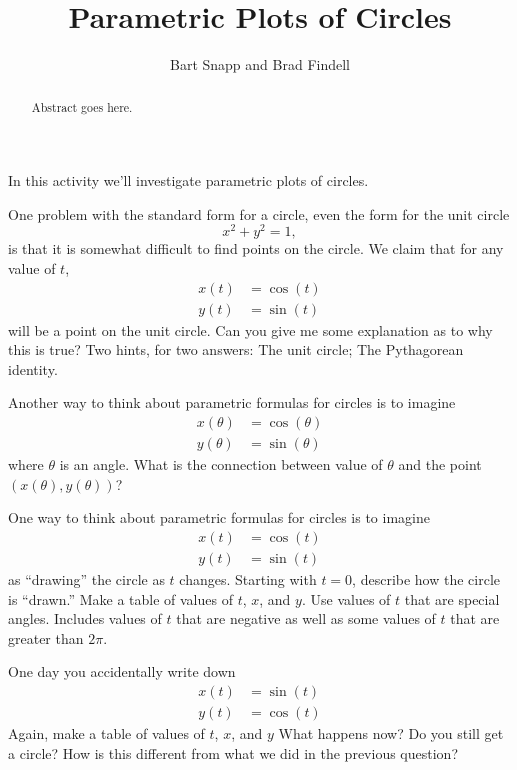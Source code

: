 \documentclass{ximera}
\title{Parametric Plots of Circles}
\author{Bart Snapp and Brad Findell}
\begin{document}
\begin{abstract}
Abstract goes here.  
\end{abstract}
\maketitle

In this activity we'll investigate parametric plots of circles.


\begin{problem} 
One problem with the standard form for a circle, even the form for the unit circle
\[
x^2 + y^2 = 1,
\]
is that it is somewhat difficult to find points on the circle. We
claim that for any value of $t$,
\begin{align*}
x(t) &= \cos(t)\\
y(t) &= \sin(t) 
\end{align*}
will be a point on the unit circle. Can you give me some explanation
as to why this is true? Two hints, for two answers: The unit circle;
The Pythagorean identity.
\end{problem} 

\begin{problem}
Another way to think about parametric formulas for circles is to imagine 
\begin{align*}
x(\theta) &= \cos(\theta)\\
y(\theta) &= \sin(\theta) 
\end{align*}
where $\theta$ is an angle. What is the connection between value of
$\theta$ and the point $(x(\theta), y(\theta))$?
\end{problem}

\begin{problem}
One way to think about parametric formulas for circles is to imagine 
\begin{align*}
x(t) &= \cos(t)\\
y(t) &= \sin(t) 
\end{align*}
as ``drawing'' the circle as $t$ changes. Starting with $t=0$,
describe how the circle is ``drawn.''  Make a table of values of $t$, $x$, and $y$.  Use values of $t$ that are special angles.  Includes values of $t$ that are negative as well as some values of $t$ that are greater than $2\pi$.  
\end{problem}

\begin{problem}
One day you accidentally write down
\begin{align*}
x(t) &= \sin(t)\\
y(t) &= \cos(t) 
\end{align*}
Again, make a table of values of $t$, $x$, and $y$
What happens now? Do you still get a circle? How is this different
from what we did in the previous question?
\end{problem}
\end{document}
